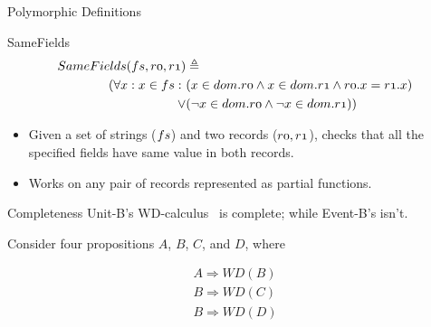 \documentclass[11pt]{beamer}
\newcommand{\unitb}{Unit-B\xspace}
\newcommand{\eventb}{Event-B\xspace}
\begin{document}
\begin{frame}[fragile]{Polymorphic Definitions}
  \begin{block}{SameFields}
  \begin{align*}
    \mathnormal{SameFields(fs, r0, r1)} & \triangleq \\
    \mathnormal{(\forall x: x \in fs:\ }
    & \mathnormal{(x \in dom.r0 \wedge x \in dom.r1 \wedge r0.x =
      r1.x)}\\
    \mathnormal{\vee} & \mathnormal{(\neg x \in dom.r0 \wedge \neg x
      \in dom.r1))}
  \end{align*}
  \end{block}
  \pause

  \begin{itemize}[<+->]
  \item Given a set of strings ($\mathnormal{fs}$) and two records
    ($\mathnormal{r0, r1}$), checks that all the specified fields have
    same value in both records.
  \item Works on any pair of records represented as partial functions.
  \end{itemize}
\end{frame}

\begin{frame}{Completeness}
  \unitb's WD-calculus~\cite{DBLP:conf/cade/DarvasMR08} is complete;
  while \eventb's isn't.
  \pause

  \vspace{0.5cm}
  Consider four propositions $A$, $B$, $C$, and $D$, where

  \vspace{-3ex}
  \begin{eqnarray*}
    A \Rightarrow WD(B) \\
    B \Rightarrow WD(C) \\
    B \Rightarrow WD(D)
  \end{eqnarray*}
\end{frame}
\end{document}
